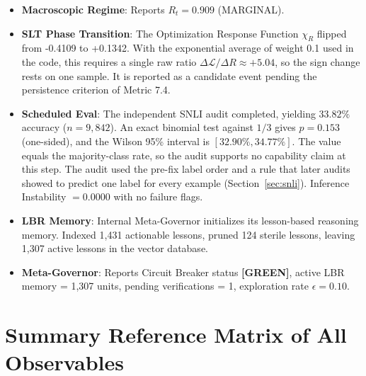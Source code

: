 \documentclass[11pt,a4paper]{article}
\begin{document}
\begin{itemize}[leftmargin=*]
    \item \textbf{Macroscopic Regime}: Reports $R_t = 0.909$ (\textsf{MARGINAL}). 
    \item \textbf{SLT Phase Transition}: The Optimization Response Function $\chi_R$ flipped from -0.4109 to +0.1342. With the exponential average of weight 0.1 used in the code, this requires a single raw ratio $\Delta\mathcal{L}/\Delta R \approx +5.04$, so the sign change rests on one sample. It is reported as a candidate event pending the persistence criterion of Metric 7.4.
    \item \textbf{Scheduled Eval}: The independent SNLI audit completed, yielding $33.82\%$ accuracy ($n = 9{,}842$). An exact binomial test against $1/3$ gives $p = 0.153$ (one-sided), and the Wilson 95\% interval is $[32.90\%, 34.77\%]$. The value equals the majority-class rate, so the audit supports no capability claim at this step. The audit used the pre-fix label order and a rule that later audits showed to predict one label for every example (Section~\ref{sec:snli}). Inference Instability $= 0.0000$ with no failure flags.
    \item \textbf{LBR Memory}: Internal Meta-Governor initializes its lesson-based reasoning memory. Indexed 1,431 actionable lessons, pruned 124 sterile lessons, leaving 1,307 active lessons in the vector database.
    \item \textbf{Meta-Governor}: Reports Circuit Breaker status \textbf{[GREEN]}, active LBR memory = 1,307 units, pending verifications = 1, exploration rate $\epsilon = 0.10$.
\end{itemize}

\newpage

\section{Summary Reference Matrix of All Observables}
\end{document}
